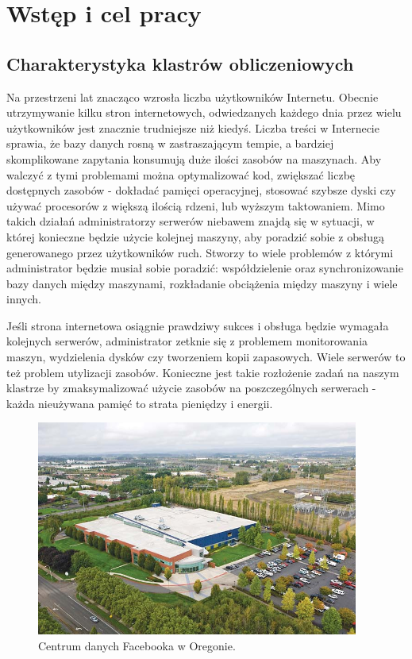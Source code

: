 \documentclass[10pt,a4paper,titlepage,twoside]{report}
\begin{document}
\newpage
{}
\onehalfspacing

\chapter{Wstęp i cel pracy}
\section{Charakterystyka klastrów obliczeniowych}
\indent \indent Na przestrzeni lat znacząco wzrosła liczba użytkowników Internetu\cite{ad1}. Obecnie utrzymywanie kilku stron internetowych, odwiedzanych każdego dnia przez wielu użytkowników jest znacznie trudniejsze niż kiedyś\cite{ad1}. Liczba treści w Internecie sprawia, że bazy danych rosną w zastraszającym tempie, a bardziej skomplikowane zapytania konsumują duże ilości zasobów na maszynach. Aby walczyć z tymi problemami można optymalizować kod, zwiększać liczbę dostępnych zasobów - dokładać pamięci operacyjnej, stosować szybsze dyski czy używać procesorów z większą ilością rdzeni, lub wyższym taktowaniem. Mimo takich działań administratorzy serwerów niebawem znajdą się w sytuacji, w której konieczne będzie użycie kolejnej maszyny, aby poradzić sobie z obsługą generowanego przez użytkowników ruch\cite{ad2}. Stworzy to wiele problemów z którymi administrator będzie musiał sobie poradzić: współdzielenie oraz synchronizowanie bazy danych między maszynami, rozkładanie obciążenia między maszyny i wiele innych\cite{ad2}.

Jeśli strona internetowa osiągnie prawdziwy sukces i obsługa będzie wymagała kolejnych serwerów, administrator zetknie się z problemem monitorowania maszyn, wydzielenia dysków czy tworzeniem kopii zapasowych. Wiele serwerów to też problem utylizacji zasobów. Konieczne jest takie rozłożenie zadań na naszym klastrze by zmaksymalizować użycie zasobów na poszczególnych serwerach - każda nieużywana pamięć to strata pieniędzy i energii\cite{ad3}.

\begin{figure}[ht!]
	\centering
	\includegraphics[scale=0.7]{pics/Selection_615.png}
	\caption{Centrum danych Facebooka w Oregonie.}
	\label{facebook_dc}
\end{figure}
\end{document}
